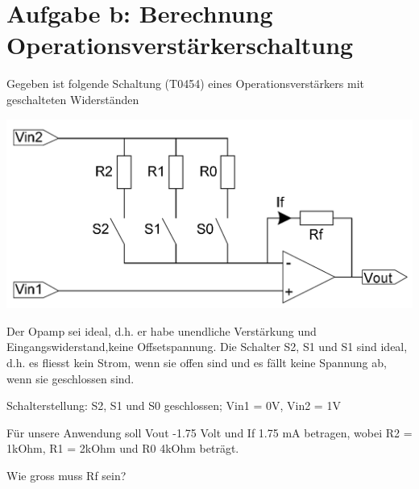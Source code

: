 \newpage
\section*{Aufgabe b: Berechnung Operationsverstärkerschaltung}
Gegeben ist folgende Schaltung (T0454) eines Operationsverstärkers mit geschalteten Widerständen

\includegraphics[width=1.2\textwidth]{images/opAmp.png}

Der Opamp sei ideal, d.h. er habe unendliche Verstärkung und Eingangswiderstand,keine Offsetspannung. 
Die Schalter S2, S1 und S1 sind ideal, d.h. es fliesst kein Strom, wenn sie offen sind und es fällt keine Spannung ab, wenn sie geschlossen sind.

Schalterstellung: S2, S1 und S0 geschlossen; Vin1 = 0V, Vin2 = 1V

Für unsere Anwendung soll Vout -1.75 Volt und If 1.75 mA betragen, wobei R2 = 1kOhm, R1 = 2kOhm und R0 4kOhm beträgt.

Wie gross muss Rf sein?